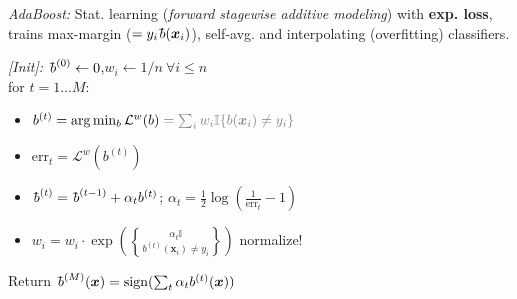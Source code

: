 
\emph{AdaBoost:}\enskip
Stat. learning (\textit{forward stagewise additive modeling}) with \textbf{exp. loss}, trains max-margin ($= y_i \bbar(\bm x_i)$), self-avg. and interpolating (overfitting) classifiers.

\begin{highlightbox}
    \textit{\scriptsize [Init]:} $\bbar^{(0)} \leftarrow 0$,\enskip $w_i \leftarrow 1/n \:\forall i\leq n$ \\
    for $t = 1 \ldots M$:
    \begin{itemize}[leftmargin=25pt]
        \item[\textit{\scriptsize [Train]:}]
            $b^{(t)} = \arg\min_b \mathcal L^w(b) \color{gray} = \sum_i w_i \mathbb I \{b(\bm x_i) \neq y_i\}$
        \item[\textit{\scriptsize [Eval]:}]
            $\mathrm{err}_t = \mathcal L^w(b^{(t)})$
        \item[\textit{\scriptsize [Aggr]:}]
            $\bbar^{(t)} = \bbar^{(t-1)} + \alpha_t b^{(t)}$;\enskip
            $\alpha_t = \frac12 \log(\frac{1}{\mathrm{err}_t} - 1)$
        \vspace{-2pt}
        \item[\textit{\scriptsize [Reweight]:}]
            $w_i = w_i \cdot \exp(\alpha_t \mathbb I\brace{b^{(t)}(\bm x_i) \neq y_i})$
            {\small normalize!}
    \end{itemize}
    Return $\bbar^{(M)}(\bm x) = \mathrm{sign}(\sum_t \alpha_t b^{(t)}(\bm x))$
\end{highlightbox}

